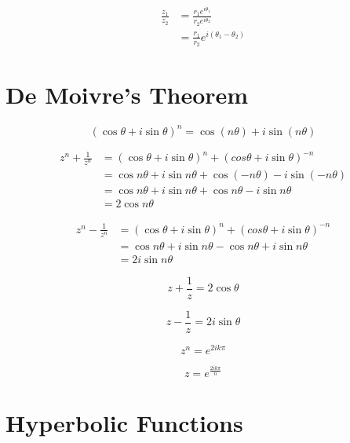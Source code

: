 \begin{align*}
    \frac{z_1}{z_2} &= \frac{r_1e^{i\theta_1}}{r_2e^{i\theta_2}}\\
    &= \frac{r_1}{r_2}e^{i(\theta_1 - \theta_2)}
\end{align*}

\section{De Moivre's Theorem}
\begin{equation*}
    (\cos\theta + i\sin\theta)^n = \cos(n\theta) + i\sin(n\theta)
\end{equation*}

\begin{align*}
    z^n + \frac{1}{z^n} &= (\cos\theta + i\sin\theta)^n + (cos\theta + i\sin\theta)^{-n}\\
    &= \cos n\theta + i\sin n\theta + \cos(-n\theta) - i\sin(-n\theta)\\
    &= \cos n\theta + i\sin n\theta + \cos n\theta - i\sin n\theta\\
    &= 2\cos n\theta
\end{align*}

\begin{align*}
    z^n - \frac{1}{z^n} &= (\cos\theta + i\sin\theta)^n + (cos\theta + i\sin\theta)^{-n}\\
    &= \cos n\theta + i\sin n\theta - \cos n\theta + i\sin n\theta\\
    &= 2i\sin n\theta
\end{align*}

\begin{equation*}
    z + \frac{1}{z} = 2\cos\theta
\end{equation*}

\begin{equation*}
    z - \frac{1}{z} = 2i\sin\theta
\end{equation*}

\begin{equation*}
    z^n = e^{2ik\pi}
\end{equation*}

\begin{equation*}
    z = e^{\frac{2ik\pi}{n}}
\end{equation*}

\section{Hyperbolic Functions}

